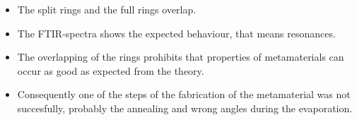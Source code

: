 \begin{itemize}

\item{The split rings and the full rings overlap.} 
\item{The FTIR-spectra shows the expected behaviour, that means resonances.}
\item{The overlapping of the rings prohibits that properties of metamaterials can occur as good as expected from the theory.}
\item{Consequently one of the steps of the fabrication of the metamaterial was not succesfully, probably the annealing and wrong angles during the evaporation.}
\end{itemize}  
